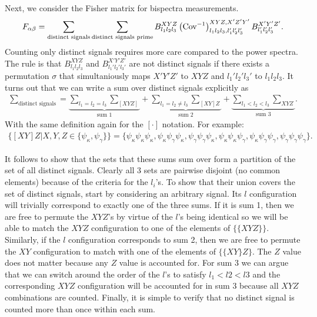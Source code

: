 \documentclass[11pt]{article} %
\DeclareRobustCommand{\Cov}{\ifmmode\text{Cov}\else d\fi}
\newcommand{\br}[1]{\ensuremath{\left( #1 \right)}}
\begin{document}
Next, we consider the Fisher matrix for bispectra measurements.
\begin{equation*}
    F_{\alpha\beta} = \sum_{\text{distinct signals}}\sum_{\text{distinct signals prime}} B^{XYZ}_{l_1l_2l_3}\br{\Cov^{-1}}^{XYZ,X'Z'Y'}_{l_1l_2l_3,l_1'l_2'l_3'}B^{X'Y'Z'}_{l_1'l_2'l_3'}.
\end{equation*} 
Counting only distinct signals requires more care compared to the power spectra. The rule is that $B^{XYZ}_{l_1l_2l_3}$ and $B^{X'Y'Z'}_{l_1'l_2'l_3'}$ are not distinct signals if there exists a permutation $\sigma$ that simultaniously maps $X'Y'Z'$ to $XYZ$ and $l_1'l_2'l_3'$ to $l_1l_2l_3$. It turns out that we can write a sum over distinct signals explicitly as
\begin{gather*}
    \sum_{\text{distinct signals}} = \underbrace{\sum_{l_1=l_2=l_3}\sum_{[XYZ]}}_{\text{sum }1} + \underbrace{\sum_{l_1=l_2\neq l_3}\sum_{[XY]Z}}_{\text{sum }2} + \underbrace{\sum_{l_1<l_2<l_3}\sum_{XYZ}}_{\text{sum }3}.
\end{gather*}
With the same definition again for the $[\cdot]$ notation. For example:
\begin{gather*}
    \{[XY]Z|X,Y,Z\in\{\psi_\kappa, \psi_\gamma\}\} = \{\psi_\kappa\psi_\kappa\psi_\kappa, \psi_\kappa\psi_\gamma\psi_\kappa, \psi_\gamma\psi_\gamma\psi_\kappa,\psi_\kappa\psi_\kappa\psi_\gamma, \psi_\kappa\psi_\gamma\psi_\gamma, \psi_\gamma\psi_\gamma\psi_\gamma\}.
\end{gather*}

It follows to show that the sets that these sums sum over form a partition of the set of all distinct signals. Clearly all 3 sets are pairwise disjoint (no common elements) because of the criteria for the $l_i$'s. To show that their union covers the set of distinct signals, start by considering an arbitrary signal. Its $l$ configuration will trivially correspond to exactly one of the three sums. If it is sum 1, then we are free to permute the $XYZ$'s by virtue of the $l$'s being identical so we will be able to match the $XYZ$ configuration to one of the elements of $\{\{XYZ\}\}$. Similarly, if the $l$ configuration corresponds to sum 2, then we are free to permute the $XY$ configuration to match with one of the elements of $\{\{XY\}Z\}$. The $Z$ value does not matter because any $Z$ value is accounted for. For sum 3 we can argue that we can switch around the order of the $l$'s to satisfy $l_1 < l2 < l3$ and the corresponding $XYZ$ configuration will be accounted for in sum 3 because all $XYZ$ combinations are counted. Finally, it is simple to verify that no distinct signal is counted more than once within each sum.
\end{document}
